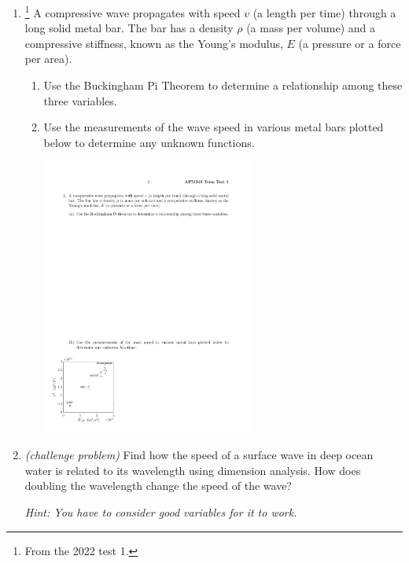 \begin{enumerate}
	
	
	
\vfil 



\item \label{q2} \footnote{From the 2022 test 1.} A compressive wave propagates with speed $v$ (a length per time) through a long solid metal bar. The bar has a density $\rho$ (a mass per volume) and a compressive stiffness, known as the Young's modulus, $E$ (a pressure or a force per area).

\begin{enumerate}

	\item Use the Buckingham Pi Theorem to determine a relationship among these three variables.

	\item Use the measurements of the wave speed in various metal bars plotted below to determine any unknown functions.
	
	\hfill
	\includegraphics[width=200pt]{WaveSpeed_YoungModulus.pdf}
	
	
\end{enumerate}


\vfil 

\item \label{q3} \textit{(challenge problem)} Find how the speed of a surface wave in deep ocean water is related to its wavelength using dimension analysis. How does doubling the wavelength change the speed of the wave?

\textit{Hint: You have to consider good variables for it to work.}

\end{enumerate}
















